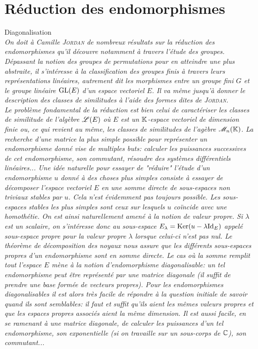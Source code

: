 \chapter{Réduction des endomorphismes}

{\Large Diagonalisation } \\

\textsl{On doit à Camille \textsc{Jordan} de nombreux résultats sur la réduction des endomorphismes qu'il découvre notamment à travers l'étude des groupes. Dépassant la notion des groupes de permutations pour en atteindre une plus abstraite, il s'intéresse à la classification des groupes finis à travers leurs représentations linéaires, autrement dit les morphismes entre un groupe fini $G$ et le groupe linéaire $\mathrm{GL} (E)$ d'un espace vectoriel $E$. Il va même jusqu'à donner le description des classes de similitudes à l'aide des formes dites de \textsc{Jordan}.}\\
\textsl{Le problème fondamental de la réduction est bien celui de caractériser les classes de similitude de l'algèbre $\mathscr{L}(E)$ où $E$ est un $\mathbb{K}$-espace vectoriel de dimension finie ou, ce qui revient au même, les classes de similitudes de l'agèbre $\mathscr{M}_n(\mathbb{K})$. La recherche d'une matrice la plus simple possible pour représenter un endomorphisme donné vise de multiples buts: calculer les puissances successives de cet endomorphisme, son commutant, résoudre des systèmes différentiels linéaires... Une idée naturelle pour essayer de "réduire" l'étude d'un endomorphisme $u$ donné à des choses plus simples consiste à essayer de décomposer l'espace vectoriel $E$ en une somme directe de sous-espaces non triviaux stables par $u$. Cela n'est évidemment pas toujours possible. Les sous-espaces stables les plus simples sont ceux sur lesquels $u$ coïncide avec une homothétie. On est ainsi naturellement amené à la notion de valeur propre. Si $\lambda$ est un scalaire, on s'intéresse donc au sous-espace $E_\lambda = \mathrm{Ker}(u - \lambda \mathrm{Id}_E)$ appelé sous-espace propre pour la valeur propre $\lambda$ lorsque celui-ci n'est pas nul. Le théorème de décomposition des noyaux nous assure que les différents sous-espaces propres d'un endomorphisme sont en somme directe. Le cas où la somme remplit tout l'espace $E$ mène à la notion d'endomorphisme diagonalisable: un tel endomorphisme peut être représenté par une matrice diagonale (il suffit de prendre une base formée de vecteurs propres). Pour les endomorphismes diagonalisables il est alors très facile de répondre à la question initiale de savoir quand ils sont semblables: il faut et suffit qu'ils aient les mêmes valeurs propres et que les espaces propres associés aient la même dimension. Il est aussi facile, en se ramenant à une matrice diagonale, de calculer les puissances d'un tel endomorphisme, son exponentielle (si on travaille sur un sous-corps de $\mathbb{C}$), son commutant...} \\

